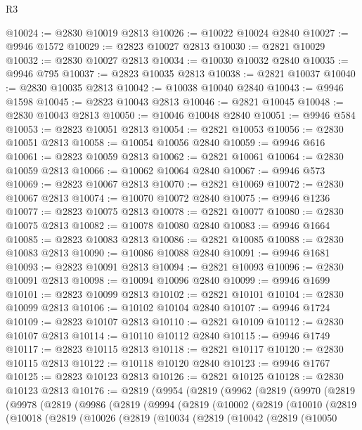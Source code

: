 \begin{lexlean}{R3}
\begin{coremodule}
@10024 := @2830 @10019 @2813
@10026 := @10022 @10024 @2840
@10027 := @9946 @1572
@10029 := @2823 @10027 @2813
@10030 := @2821 @10029
@10032 := @2830 @10027 @2813
@10034 := @10030 @10032 @2840
@10035 := @9946 @795
@10037 := @2823 @10035 @2813
@10038 := @2821 @10037
@10040 := @2830 @10035 @2813
@10042 := @10038 @10040 @2840
@10043 := @9946 @1598
@10045 := @2823 @10043 @2813
@10046 := @2821 @10045
@10048 := @2830 @10043 @2813
@10050 := @10046 @10048 @2840
@10051 := @9946 @584
@10053 := @2823 @10051 @2813
@10054 := @2821 @10053
@10056 := @2830 @10051 @2813
@10058 := @10054 @10056 @2840
@10059 := @9946 @616
@10061 := @2823 @10059 @2813
@10062 := @2821 @10061
@10064 := @2830 @10059 @2813
@10066 := @10062 @10064 @2840
@10067 := @9946 @573
@10069 := @2823 @10067 @2813
@10070 := @2821 @10069
@10072 := @2830 @10067 @2813
@10074 := @10070 @10072 @2840
@10075 := @9946 @1236
@10077 := @2823 @10075 @2813
@10078 := @2821 @10077
@10080 := @2830 @10075 @2813
@10082 := @10078 @10080 @2840
@10083 := @9946 @1664
@10085 := @2823 @10083 @2813
@10086 := @2821 @10085
@10088 := @2830 @10083 @2813
@10090 := @10086 @10088 @2840
@10091 := @9946 @1681
@10093 := @2823 @10091 @2813
@10094 := @2821 @10093
@10096 := @2830 @10091 @2813
@10098 := @10094 @10096 @2840
@10099 := @9946 @1699
@10101 := @2823 @10099 @2813
@10102 := @2821 @10101
@10104 := @2830 @10099 @2813
@10106 := @10102 @10104 @2840
@10107 := @9946 @1724
@10109 := @2823 @10107 @2813
@10110 := @2821 @10109
@10112 := @2830 @10107 @2813
@10114 := @10110 @10112 @2840
@10115 := @9946 @1749
@10117 := @2823 @10115 @2813
@10118 := @2821 @10117
@10120 := @2830 @10115 @2813
@10122 := @10118 @10120 @2840
@10123 := @9946 @1767
@10125 := @2823 @10123 @2813
@10126 := @2821 @10125
@10128 := @2830 @10123 @2813
@10176 := @2819
    (@9954
      (@2819
        (@9962
          (@2819
            (@9970
              (@2819
                (@9978
                  (@2819
                    (@9986
                      (@2819
                        (@9994
                          (@2819
                            (@10002
                              (@2819
                                (@10010
                                  (@2819
                                    (@10018
                                      (@2819
                                        (@10026
                                          (@2819
                                            (@10034
                                              (@2819
                                                (@10042
                                                  (@2819
                                                    (@10050

\end{coremodule}
\end{lexlean}
